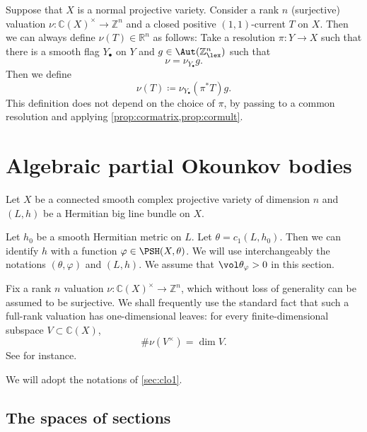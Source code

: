 \begin{remark}\label{rmk:valcurr}
    Suppose that $X$ is a normal projective variety. Consider a rank $n$ (surjective) valuation $\nu\colon \mathbb{C}(X)^{\times}\rightarrow \mathbb{Z}^n$ and a closed positive $(1,1)$-current $T$ on $X$. Then we can always define $\nu(T)\in \mathbb{R}^n$ as follows: Take a resolution $\pi\colon Y\rightarrow X$ such that there is a smooth flag $Y_{\bullet}$ on $Y$ and $g\in \Aut(\mathbb{Z}^n_{\lex})$ such that
    \[
    \nu=\nu_{Y_{\bullet}}g.
    \]
    Then we define
    \[
    \nu(T)\coloneqq \nu_{Y_{\bullet}}(\pi^*T)g.
    \]
    This definition does not depend on the choice of $\pi$, by passing to a common resolution and applying \cref{prop:cormatrix,prop:cormult}.
\end{remark}

\section{Algebraic partial Okounkov bodies}\label{sec:PoB}
Let $X$ be a connected smooth complex projective variety of dimension $n$ and $(L,h)$ be a Hermitian big line bundle on $X$.

Let $h_0$ be a smooth Hermitian metric on $L$. Let $\theta=c_1(L,h_0)$. Then we can identify $h$ with a function $\varphi\in \PSH(X,\theta)$.
We will use interchangeably the notations $(\theta,\varphi)$ and $(L,h)$. We assume that $\vol \theta_{\varphi}>0$ in this section.

Fix a rank $n$ valuation $\nu\colon \mathbb{C}(X)^{\times}\rightarrow \mathbb{Z}^n$, which without loss of generality can be assumed to be surjective. We shall frequently use the standard fact that such a full-rank valuation has one-dimensional leaves: for every finite-dimensional subspace $V\subset \mathbb C(X)$,
\[
    \#\nu(V^\times)=\dim V.
\]
See \cite[Lemma~1.3]{LM09} for instance.

We will adopt the notations of \cref{sec:clo1}.

\subsection{The spaces of sections}
\label{subsec:section_spaces}

